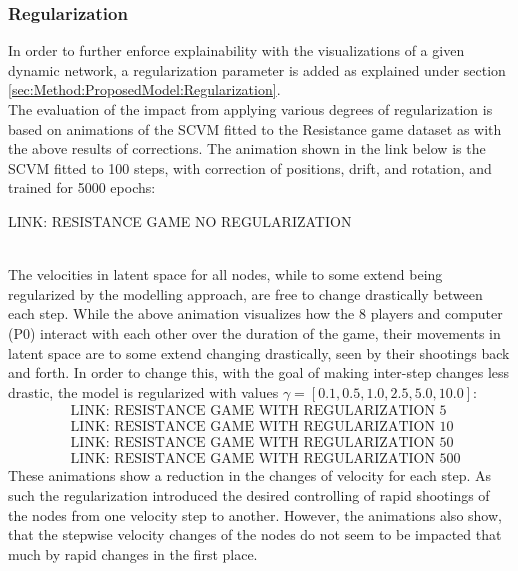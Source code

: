 \subsubsection{Regularization}
\label{sec:ResearchQuestion3:Regularization}
In order to further enforce explainability with the visualizations of a given dynamic network, a regularization parameter is added as explained under section \ref{sec:Method:ProposedModel:Regularization}.
\\
The evaluation of the impact from applying various degrees of regularization is based on animations of the SCVM fitted to the Resistance game dataset as with the above results of corrections.
The animation shown in the link below is the SCVM fitted to 100 steps, with correction of positions, drift, and rotation, and trained for 5000 epochs:
\begin{center}
LINK: RESISTANCE GAME NO REGULARIZATION
\end{center}
\\
The velocities in latent space for all nodes, while to some extend being regularized by the modelling approach, are free to change drastically between each step.
While the above animation visualizes how the 8 players and computer (P0) interact with each other over the duration of the game, their movements in latent space are to some extend changing drastically, seen by their shootings back and forth.
In order to change this, with the goal of making inter-step changes less drastic, the model is regularized with values $\gamma = [0.1, 0.5, 1.0, 2.5, 5.0, 10.0]$:
\begin{align*}
    &\text{LINK: RESISTANCE GAME WITH REGULARIZATION 5} \\
    &\text{LINK: RESISTANCE GAME WITH REGULARIZATION 10} \\
    &\text{LINK: RESISTANCE GAME WITH REGULARIZATION 50} \\
    &\text{LINK: RESISTANCE GAME WITH REGULARIZATION 500}
\end{align*}
These animations show a reduction in the changes of velocity for each step. As such the regularization introduced the desired controlling of rapid shootings of the nodes from one velocity step to another. However, the animations also show, that the stepwise velocity changes of the nodes do not seem to be impacted that much by rapid changes in the first place.
\clearpage
